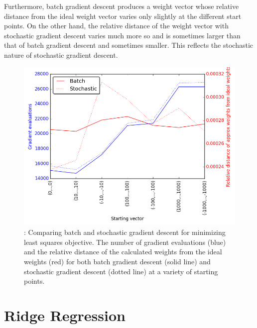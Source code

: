 \documentclass[10pt]{article}
\begin{document}
\medskip

Furthermore, batch gradient descent produces a weight vector whose relative distance from the ideal weight vector varies only slightly at the different start points. On the other hand, the relative distance of the weight vector with stochastic gradient descent varies much more so and is sometimes larger than that of batch gradient descent and sometimes smaller. This reflects the stochastic nature of stochastic gradient descent.


\begin{figure}
\centering
\includegraphics[width=.4\textwidth,height =0.25\textheight]{batch_stochastic_comp.png}
\caption{\label{fig:1.3}: Comparing batch and stochastic gradient descent for minimizing least squares objective. The number of gradient evaluations (blue) and the relative distance of the calculated weights from the ideal weights (red) for both batch gradient descent (solid line) and stochastic gradient descent (dotted line) at a variety of starting points.}
\end{figure}

\section{Ridge Regression}
\end{document}
